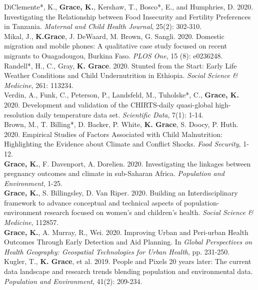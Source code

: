 \documentclass[11pt]{article} %
\begin{document}
\noindent
DiClemente*, K., \textbf{ Grace, K.}, Kershaw, T., Bosco*, E., and Humphries, D. 2020. Investigating the Relationship between Food Insecurity and Fertility Preferences in Tanzania. \textit{Maternal and Child Health Journal}, 25(2): 302-310.\\


\noindent
Mikal, J., \textbf{K.Grace}, J. DeWaard, M. Brown, G. Sangli. 2020. Domestic migration and mobile phones:  A qualitative case study focused on recent migrants to Ouagadougou, Burkina Faso. \textit{PLOS One}, 15 (8): e0236248.\\

\noindent
Randell*, H., C., Gray, \textbf{K. Grace}. 2020. Stunted from the Start: Early Life Weather Conditions and Child Undernutrition in Ethiopia. \textit{Social Science \& Medicine}, 261: 113234.\\

\noindent
Verdin, A., Funk, C., Peterson, P., Landsfeld, M., Tuholske*, C., \textbf{Grace, K.} 2020. Development and validation of the CHIRTS-daily quasi-global high-resolution daily temperature data set. 
\textit{Scientific Data}, 7(1): 1-14.\\

\noindent
Brown, M., T. Billing*, D. Backer, P. White, \textbf{K. Grace}, S. Doocy, P. Huth. 2020. Empirical Studies of Factors Associated with Child Malnutrition: Highlighting the Evidence about Climate and Conflict Shocks. \textit{Food Security}, 1-12.\\

\noindent
\textbf{Grace, K.}, F. Davenport, A. Dorelien. 2020.  Investigating the linkages between pregnancy outcomes and climate in sub-Saharan Africa. \textit{Population and Environment}, 1-25.\\

\noindent
\textbf{Grace, K.}, S. Billingsley, D. Van Riper.  2020. Building an Interdisciplinary framework to advance conceptual and technical aspects of population-environment research focused on women's and children's health. \textit{Social Science \& Medicine}, 112857.\\

\noindent
\textbf{Grace, K.}, A. Murray, R., Wei. 2020. Improving Urban and Peri-urban Health Outcomes Through Early Detection and Aid Planning.  In \textit{Global Perspectives on Health Geography: Geospatial Technologies for Urban Health}, pp. 231-250.\\

\noindent
Kugler, T., \textbf{K. Grace}, et al. 2019. People and Pixels 20 years later: The current data landscape and research trends blending population and environmental data. \textit{Population and Environment}, 41(2): 209-234.\\
\end{document}
